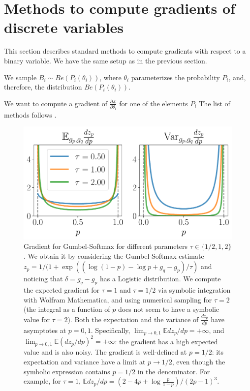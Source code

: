 \documentclass[a4paper,11pt,oneside]{report}
\begin{document}
\section{Methods to compute gradients of discrete variables}
\label{sec:grad_discrete}
This section describes standard methods to compute gradients with respect to a binary variable. We have the same setup as in the previous section.

We sample $B_i\sim Be(P_i(\theta_i))$, where $\theta_i$ parameterizes the probability $P_i$, and, therefore, the distribution $Be(P_i(\theta_i))$.

We want to compute a gradient of $\frac{\partial \mathcal L}{\partial \theta_i}$ for one of the elements $P_i$ The list of methods follows \cite{Bengio2013, Weib2011,Maddison2017}.%

\begin{figure}[h]
    \centering
    \includegraphics[width=0.8\linewidth]{plots/plot_gumbel_gradient.pdf}
    \caption{Gradient for Gumbel-Softmax for different parameters $\tau\in\{1/2,1,2\}$. We obtain it by considering the Gumbel-Softmax estimate $z_p=1/(1+\exp((\log(1-p)-\log p+g_q-g_p)/\tau)$ and noticing that $\delta=g_q-g_p$ has a Logistic distribution. We compute the expected gradient for $\tau=1$ and $\tau=1/2$ via symbolic integration with Wolfram Mathematica, and using numerical sampling for $\tau=2$ (the integral as a function of $p$ does not seem to have a symbolic value for $\tau=2$). Both the expectation and the variance of $\frac{dz_p}{dp}$ have asymptotes at $p=0,1$. Specifically, $\lim_{p\to 0,1}\mathbb E dz_p/dp=+\infty$, and $\lim_{p\to 0,1}\mathbb E \left(dz_p/dp\right)^2=+\infty$: the gradient has a high expected value and is also noisy. The gradient is well-defined at $p=1/2$: its expectation and variance have a limit at $p\to 1/2$, even though the symbolic expression contains $p=1/2$ in the denominator. For example, for $\tau=1$, $\mathbb E dz_p/dp=(2-4p+\log\frac{p}{1-p})/(2p-1)^3$.}
    \label{fig:gumbel_gradient}
\end{figure}
\end{document}
